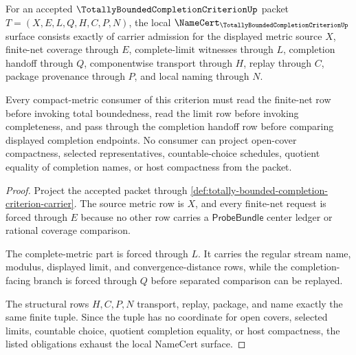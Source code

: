 \begin{theorem}
\label{thm:totally-bounded-completion-criterion-namecert-obligations}
For an accepted $\TotallyBoundedCompletionCriterionUp$ packet $T=(X,E,L,Q,H,C,P,N)$, the local $\NameCert_{\TotallyBoundedCompletionCriterionUp}$ surface consists exactly of carrier admission for the displayed metric source $X$, finite-net coverage through $E$, complete-limit witnesses through $L$, completion handoff through $Q$, componentwise transport through $H$, replay through $C$, package provenance through $P$, and local naming through $N$.

Every compact-metric consumer of this criterion must read the finite-net row before invoking total boundedness, read the limit row before invoking completeness, and pass through the completion handoff row before comparing displayed completion endpoints. No consumer can project open-cover compactness, selected representatives, countable-choice schedules, quotient equality of completion names, or host compactness from the packet.
\end{theorem}
\begin{proof}
Project the accepted packet through \autoref{def:totally-bounded-completion-criterion-carrier}. The source metric row is $X$, and every finite-net request is forced through $E$ because no other row carries a $\mathsf{ProbeBundle}$ center ledger or rational coverage comparison.

The complete-metric part is forced through $L$. It carries the regular stream name, modulus, displayed limit, and convergence-distance rows, while the completion-facing branch is forced through $Q$ before separated comparison can be replayed.

The structural rows $H,C,P,N$ transport, replay, package, and name exactly the same finite tuple. Since the tuple has no coordinate for open covers, selected limits, countable choice, quotient completion equality, or host compactness, the listed obligations exhaust the local NameCert surface.
\end{proof}

